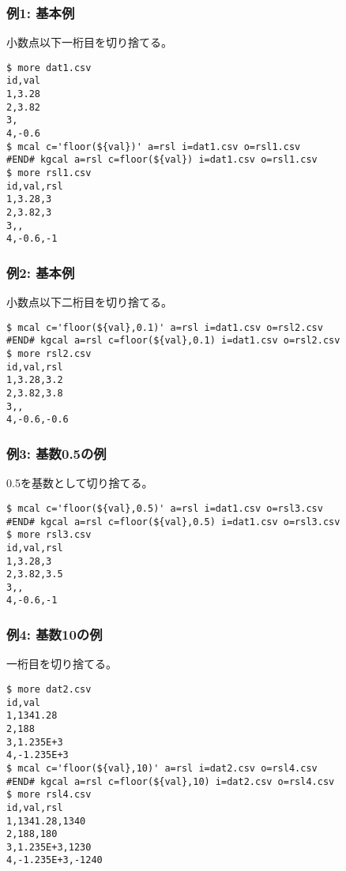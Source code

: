 \subsubsection*{例1: 基本例}

小数点以下一桁目を切り捨てる。


\begin{Verbatim}[baselinestretch=0.7,frame=single]
$ more dat1.csv
id,val
1,3.28
2,3.82
3,
4,-0.6
$ mcal c='floor(${val})' a=rsl i=dat1.csv o=rsl1.csv
#END# kgcal a=rsl c=floor(${val}) i=dat1.csv o=rsl1.csv
$ more rsl1.csv
id,val,rsl
1,3.28,3
2,3.82,3
3,,
4,-0.6,-1
\end{Verbatim}
\subsubsection*{例2: 基本例}

小数点以下二桁目を切り捨てる。


\begin{Verbatim}[baselinestretch=0.7,frame=single]
$ mcal c='floor(${val},0.1)' a=rsl i=dat1.csv o=rsl2.csv
#END# kgcal a=rsl c=floor(${val},0.1) i=dat1.csv o=rsl2.csv
$ more rsl2.csv
id,val,rsl
1,3.28,3.2
2,3.82,3.8
3,,
4,-0.6,-0.6
\end{Verbatim}
\subsubsection*{例3: 基数0.5の例}

0.5を基数として切り捨てる。


\begin{Verbatim}[baselinestretch=0.7,frame=single]
$ mcal c='floor(${val},0.5)' a=rsl i=dat1.csv o=rsl3.csv
#END# kgcal a=rsl c=floor(${val},0.5) i=dat1.csv o=rsl3.csv
$ more rsl3.csv
id,val,rsl
1,3.28,3
2,3.82,3.5
3,,
4,-0.6,-1
\end{Verbatim}
\subsubsection*{例4: 基数10の例}

一桁目を切り捨てる。


\begin{Verbatim}[baselinestretch=0.7,frame=single]
$ more dat2.csv
id,val
1,1341.28
2,188
3,1.235E+3
4,-1.235E+3
$ mcal c='floor(${val},10)' a=rsl i=dat2.csv o=rsl4.csv
#END# kgcal a=rsl c=floor(${val},10) i=dat2.csv o=rsl4.csv
$ more rsl4.csv
id,val,rsl
1,1341.28,1340
2,188,180
3,1.235E+3,1230
4,-1.235E+3,-1240
\end{Verbatim}
